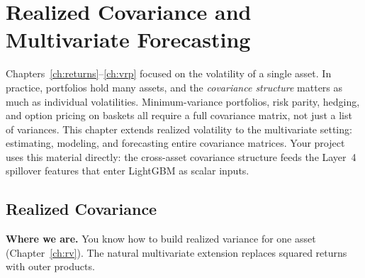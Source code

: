 
\chapter{Realized Covariance and Multivariate Forecasting}\label{ch:multivariate}

\begin{application}
Chapters~\ref{ch:returns}--\ref{ch:vrp} focused on the volatility of a single asset.
In practice, portfolios hold many assets, and the \emph{covariance structure} matters as
much as individual volatilities. Minimum-variance portfolios, risk parity, hedging, and
option pricing on baskets all require a full covariance matrix, not just a list of
variances. This chapter extends realized volatility to the multivariate setting:
estimating, modeling, and forecasting entire covariance matrices. Your
project uses this material directly: the cross-asset covariance structure
feeds the Layer~4 spillover features that enter LightGBM as scalar inputs.
\end{application}

\section{Realized Covariance}\label{sec:multivariate:rc}

\textbf{Where we are.}  You know how to build realized variance for one asset
(Chapter~\ref{ch:rv}). The natural multivariate extension replaces squared returns
with outer products.

